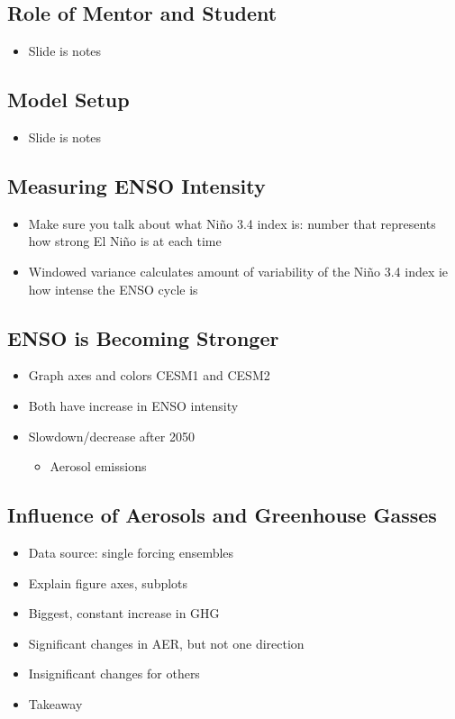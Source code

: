 \documentclass[little]{basic}
\begin{document}
\subsection*{Role of Mentor and Student}
\label{sec:org2e78332}
\begin{itemize}
\item Slide is notes
\end{itemize}
\subsection*{Model Setup}
\label{sec:org0f6ba67}
\begin{itemize}
\item Slide is notes
\end{itemize}
\subsection*{Measuring ENSO Intensity}
\label{sec:orge16e5c1}
\begin{itemize}
\item Make sure you talk about what Niño 3.4 index is: number that represents how strong El Niño is at each time
\item Windowed variance calculates amount of variability of the Niño 3.4 index ie how intense the ENSO cycle is
\end{itemize}
\subsection*{ENSO is Becoming Stronger}
\label{sec:orgb07762a}
\begin{itemize}
\item Graph axes and colors CESM1 and CESM2
\item Both have increase in ENSO intensity
\item Slowdown/decrease after 2050
\begin{itemize}
\item Aerosol emissions
\end{itemize}
\end{itemize}
\subsection*{Influence of Aerosols and Greenhouse Gasses}
\label{sec:org2b52160}
\begin{itemize}
\item Data source: single forcing ensembles
\item Explain figure axes, subplots
\item Biggest, constant increase in GHG
\item Significant changes in AER, but not one direction
\item Insignificant changes for others
\item Takeaway
\end{itemize}
\end{document}

